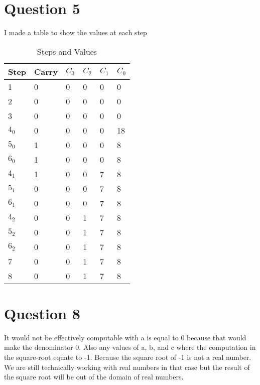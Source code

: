 \documentclass{article}%
\begin{document}
\clearpage

\section{Question 5}

I made a table to show the values at each step

\begin{table}[h]
\centering
\caption{Steps and Values}
\label{my-label}
\begin{tabular}{@{}l|l|l|l|l|l@{}}
\toprule
Step & Carry & $C_3$ & $C_2$ & $C_1$ & $C_0$ \\ \midrule
1    & 0     & 0   & 0   & 0   & 0   \\
2    & 0     & 0   & 0   & 0   & 0   \\
3    & 0     & 0   & 0   & 0   & 0   \\
$4_0$  & 0     & 0   & 0   & 0   & 18  \\
$5_0$  & 1     & 0   & 0   & 0   & 8   \\
$6_0$  & 1     & 0   & 0   & 0   & 8   \\
$4_1$  & 1     & 0   & 0   & 7   & 8   \\
$5_1$  & 0     & 0   & 0   & 7   & 8   \\
$6_1$  & 0     & 0   & 0   & 7   & 8   \\
$4_2$  & 0     & 0   & 1   & 7   & 8   \\
$5_2$  & 0     & 0   & 1   & 7   & 8   \\
$6_2$  & 0     & 0   & 1   & 7   & 8   \\
7    & 0     & 0   & 1   & 7   & 8   \\
8    & 0     & 0   & 1   & 7   & 8   \\ \bottomrule
\end{tabular}
\end{table}

\section{Question 8}
It would not be effectively computable with a is equal to 0 because that would make the denominator 0. \newline \newline 
Also any values of a, b, and c where the computation in the square-root equate to -1. Because the square root of -1 is not a real number. We are still technically working with real numbers in that case but the result of the square root will be out of the domain of real numbers. 
\end{document}
